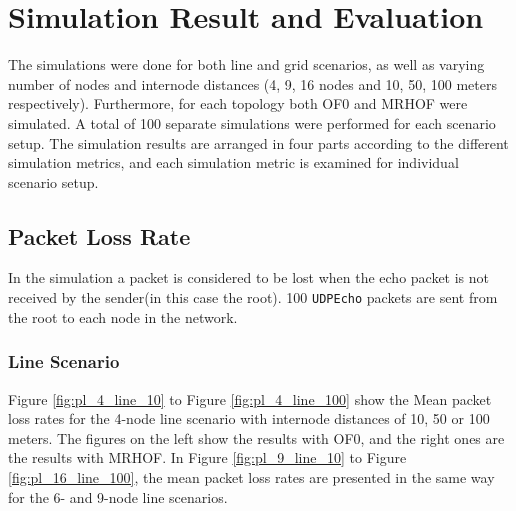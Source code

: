 \chapter{Simulation Result and Evaluation}
\label{ResultandEvaluation}

The simulations were done for both line and grid scenarios, as well as varying number of nodes and internode distances (4, 9, 16 nodes and 10, 50, 100 meters respectively). Furthermore, for each topology both OF0 and MRHOF were simulated. A total of 100 separate simulations were performed for each scenario setup. The simulation results are arranged in four parts according to the different simulation metrics, and each simulation metric is examined for individual scenario setup. 

\section{Packet Loss Rate}
\label{pl}

In the simulation a packet is considered to be lost when the echo packet is not received by the sender(in this case the root). 100 \texttt{UDPEcho} packets are sent from the root to each node in the network.

\subsection{Line Scenario}
\label{pl:line}
Figure \ref{fig:pl_4_line_10} to Figure \ref{fig:pl_4_line_100} show the Mean packet loss rates for the 4-node line scenario with internode distances of 10, 50 or 100 meters. The figures on the left show the results with OF0, and the right ones are the results with MRHOF. In Figure \ref{fig:pl_9_line_10} to Figure \ref{fig:pl_16_line_100}, the mean packet loss rates are presented in the same way for the 6- and 9-node line scenarios.


